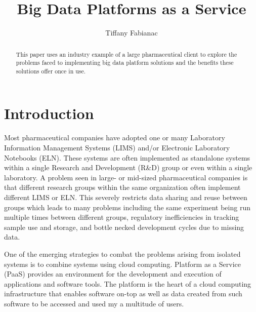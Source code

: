 \documentclass[sigconf]{acmart}
\begin{document}
\title{Big Data Platforms as a Service}


\author{Tiffany Fabianac}
\orcid{}

\renewcommand{\shortauthors}{T. Fabianac}


\begin{abstract}
This paper uses an industry example of a large pharmaceutical client to explore the problems faced to implementing big data platform solutions and the benefits these solutions offer once in use.

\end{abstract}



\maketitle

\section{Introduction}
Most pharmaceutical companies have adopted one or many Laboratory Information Management Systems (LIMS) and/or Electronic Laboratory Notebooks (ELN). These systems are often implemented as standalone systems within a single Research and Development (R\&D) group or even within a single laboratory. A problem seen in large- or mid-sized pharmaceutical companies is that different research groups within the same organization often implement different LIMS or ELN. This severely restricts data sharing and reuse between groups which leads to many problems including the same experiment being run multiple times between different groups, regulatory inefficiencies in tracking sample use and storage, and bottle necked development cycles due to missing data. 

One of the emerging strategies to combat the problems arising from isolated systems is to combine systems using cloud computing. Platform as a Service (PaaS) provides an environment for the development and execution of applications and software tools. The platform is the heart of a cloud computing infrastructure that enables software on-top as well as data created from such software to be accessed and used my a multitude of users\cite{Ojala}.
\end{document}
